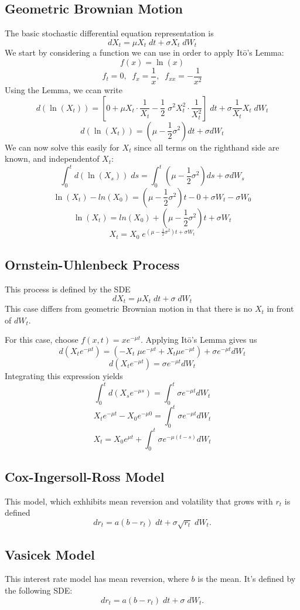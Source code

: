 \documentclass[a4paper,12pt]{scrartcl}
\begin{document}
\subsection{Geometric Brownian Motion}

The basic stochastic differential equation representation is
   \[ dX_t = \mu X_t \; dt + \sigma X_t \;dW_t \]
We start by considering a function we can use in order to apply 
It\={o}'s Lemma:
   \[ f(x) = \ln(x) \]
   \[ f_t = 0, \;\; f_x = \frac{1}{x}, \;\; f_{xx} = -\frac{1}{x^2} \]
Using the Lemma, we ccan write
   \[ d(\ln(X_t)) = \left[ 0 + \mu X_t \cdot \frac{1}{X_t} - 
      \frac{1}{2} \; \sigma^2 X_t^2 \cdot \frac{1}{X_t^2} \right]\; dt 
      + \sigma \frac{1}{X_t} X_t\; dW_t \]
   \[ d(\ln(X_t)) = \left( \mu - \frac{1}{2}\sigma^2 \right) dt
      + \sigma dW_t \]
We can now solve this easily for $X_t$ since all terms on the righthand
side are known, and independentof $X_t$:
   \[ \int^t_0 d(\ln(X_s)) \; ds =  \int^t_0 \left( \mu - 
      \frac{1}{2}\sigma^2 \right) ds + \sigma dW_s \]
   \[ \ln(X_t) - ln(X_0) = \left( \mu - 
      \frac{1}{2}\sigma^2 \right) t - 0 + \sigma W_t - \sigma W_0 \]
   \[ \ln(X_t) = ln(X_0) + \left( \mu - 
      \frac{1}{2}\sigma^2 \right) t +  \sigma W_t \]
   \[X_t = X_0 \; e^{\left( \mu - 
      \frac{1}{2}\sigma^2 \right) t +  \sigma W_t} \]

\subsection{Ornstein-Uhlenbeck Process}

This process is defined by the SDE
   \[ dX_t = \mu X_t \; dt + \sigma \;dW_t \]
This case differs from geometric Brownian motion in that there is no
$X_t$ in front of $dW_t$.

For this case, choose $f(x,t) = xe^{-\mu t}$.  Applying It\={o}'s Lemma
gives us
   \[d(X_t e^{-\mu t})=\left(-X_t\;\mu e^{-\mu t} + X_t \mu e^{-\mu t}
      \right) + \sigma e^{-\mu t} dW_t \]
   \[ d(X_t e^{-\mu t})= \sigma e^{-\mu t} dW_t \]
Integrating this expression yields
   \[ \int^t_0 d(X_s e^{-\mu s}) = \int^t_0 \sigma e^{-\mu t} dW_t \]
   \[ X_t e^{-\mu t} - X_0 e^{-\mu 0} = \int^t_0 \sigma e^{-\mu t} dW_t
      \]
   \[ X_t = X_0 e^{\mu t} + \int^t_0 \sigma e^{-\mu (t-s)} dW_t
      \]

\subsection{Cox-Ingersoll-Ross Model}

This model, which exhhibits mean reversion and volatility that grows
with $r_t$ is defined
   \[ dr_t = a(b-r_t) \; dt + \sigma \sqrt{r_t} \; dW_t.\]

\subsection{Vasicek Model}

This interest rate model has mean reversion, where $b$ is the mean. It's
defined by the following SDE:
   \[ dr_t = a(b-r_t) \; dt + \sigma \; dW_t.\]
\end{document}
